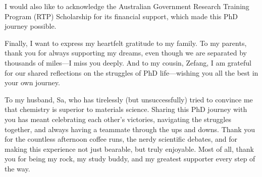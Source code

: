 I would also like to acknowledge the Australian Government Research Training Program (RTP) Scholarship for its financial support, which made this PhD journey possible.

Finally, I want to express my heartfelt gratitude to my family. To my parents, thank you for always supporting my dreams, even though we are separated by thousands of miles—I miss you deeply. And to my cousin, Zefang, I am grateful for our shared reflections on the struggles of PhD life—wishing you all the best in your own journey.

To my husband, Sa, who has tirelessly (but unsuccessfully) tried to convince me that chemistry is superior to materials science. Sharing this PhD journey with you has meant celebrating each other’s victories, navigating the struggles together, and always having a teammate through the ups and downs. Thank you for the countless afternoon coffee runs, the nerdy scientific debates, and for making this experience not just bearable, but truly enjoyable. Most of all, thank you for being my rock, my study buddy, and my greatest supporter every step of the way.
